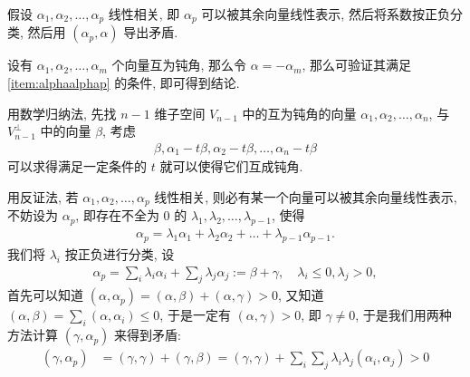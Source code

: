 \begin{exercise}[series=exer]
\begin{exercise}
  \end{exercise}
  \begin{hint}
      \begin{hintsheet}
          \item 假设 $ \alpha_{1}, \alpha_{2}, \dots, \alpha_{p} $ 线性相关, 即 $ \alpha_{p} $ 可以被其余向量线性表示, 然后将系数按正负分类, 然后用 $ (\alpha_{p}, \alpha) $ 导出矛盾.
          \item 设有 $ \alpha_{1}, \alpha_{2}, \dots, \alpha_{m} $ 个向量互为钝角, 那么令 $ \alpha = -\alpha_{m} $, 那么可验证其满足 \ref{item:alphaalphap} 的条件, 即可得到结论.
          \item 用数学归纳法, 先找 $ n - 1 $ 维子空间 $ V_{n - 1} $ 中的互为钝角的向量 $ \alpha_{1}, \alpha_{2}, \dots, \alpha_{n} $, 与 $ V_{n - 1}^{\bot} $ 中的向量 $ \beta $, 考虑
          \begin{align*}
              \beta, \alpha_{1} - t\beta, \alpha_{2} - t\beta, \dots, \alpha_{n} - t\beta
          \end{align*}
          可以求得满足一定条件的 $ t $ 就可以使得它们互成钝角.
      \end{hintsheet}
  \end{hint}
  \begin{answer}
      \begin{answersheet}
          \item 用反证法, 若 $ \alpha_{1}, \alpha_{2}, \dots, \alpha_{p} $ 线性相关, 则必有某一个向量可以被其余向量线性表示, 不妨设为 $ \alpha_{p} $, 即存在不全为 $ 0 $ 的 $ \lambda_{1}, \lambda_{2}, \dots, \lambda_{p - 1} $, 使得
          \begin{align*}
              \alpha_{p} = \lambda_{1}\alpha_{1} + \lambda_{2}\alpha_{2} + \dots + \lambda_{p - 1}\alpha_{p - 1}.
          \end{align*}
          我们将 $ \lambda_{i} $ 按正负进行分类, 设
          \begin{align*}
              \alpha_{p} = \sum_{i}\lambda_{i}\alpha_{i} + \sum_{j}\lambda_{j}\alpha_{j} := \beta + \gamma,\quad \lambda_{i} \le 0, \lambda_{j} > 0,
          \end{align*}
          首先可以知道 $ (\alpha, \alpha_{p}) = (\alpha, \beta) + (\alpha, \gamma) > 0 $, 又知道 $ (\alpha, \beta) = \sum_{i}(\alpha, \alpha_{i}) \le 0 $, 于是一定有 $ (\alpha, \gamma) > 0 $, 即 $ \gamma \ne 0 $, 于是我们用两种方法计算 $ (\gamma, \alpha_{p}) $ 来得到矛盾:
          \begin{align*}
              (\gamma, \alpha_{p}) & = (\gamma, \gamma) + (\gamma, \beta) = (\gamma, \gamma) + \sum_{i}\sum_{j}\lambda_{i}\lambda_{j}(\alpha_{i}, \alpha_{j}) > 0 \\

\end{align*}
\end{answersheet}
\end{answer}
\end{exercise}
